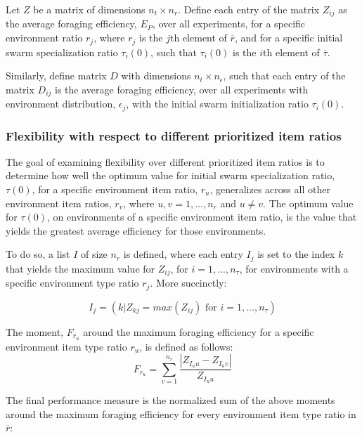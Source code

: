 Let $Z$ be a matrix of dimensions $n_t \times n_r$. Define each entry of the matrix $Z_{ij}$ as the average foraging efficiency, $E_P$, over all experiments, for a specific environment ratio $r_j$, where $r_j$ is the $j$th element of $\overline{r}$, and for a specific initial swarm specialization ratio $\tau_i(0)$, such that $\tau_i(0)$ is the $i$th element of $\overline{\tau}$.

Similarly, define matrix $D$ with dimensions $n_t \times n_\epsilon$, such that each entry of the matrix $D_{ij}$ is the average foraging efficiency, over all experiments with environment distribution, $\epsilon_j$, with the initial swarm initialization ratio $\tau_i(0)$.


\subsubsection{Flexibility with respect to different prioritized item ratios}
\label{setup:flexibility:prioritizeditemratio}

The goal of examining flexibility over different prioritized item ratios is to determine how well the optimum value for initial swarm specialization ratio, $\tau(0)$, for a specific environment item ratio, $r_u$, generalizes across all other environment item ratios, $r_v$, where $u,v = 1,...,n_r$ and $u \neq v$. The optimum value for $\tau(0)$, on environments of a specific environment item ratio, is the value that yields the greatest average efficiency for those environments.

To do so, a list $I$ of size $n_r$ is defined, where each entry $I_j$ is set to the index $k$ that yields the maximum value for $Z_{ij}$, for $i = 1,..., n_\tau$, for environments with a specific environment type ratio $r_j$. More succinctly:

\begin{equation}
I_j = ( k | Z_{kj} = max(Z_{ij}) \text{ for } i = 1,...,n_\tau)
\end{equation}

The moment, $F_{r_u}$ around the maximum foraging efficiency for a specific environment item type ratio $r_u$, is defined as follows: 
\begin{equation}
F_{r_u} = \sum_{v=1}^{n_r}\dfrac{|Z_{I_uu}- Z_{I_uv}|}{Z_{I_uu}}
\end{equation}

The final performance measure is the normalized sum of the above moments around the maximum foraging efficiency for every environment item type ratio in $\overline{r}$:

